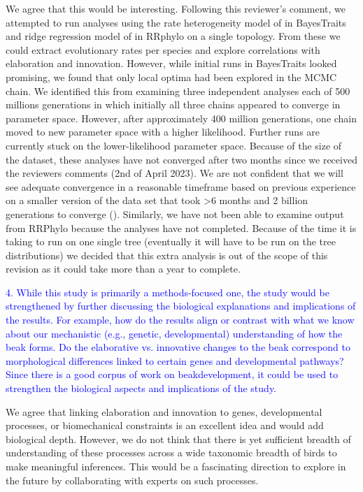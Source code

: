 \documentclass[12pt,letterpaper]{article}
\begin{document}
{We agree that this would be interesting. Following this reviewer’s comment, we attempted to run analyses using the rate heterogeneity model of \cite{venditti2011multiple} in BayesTraits and ridge regression model of \cite{castiglione2018} in  RRphylo on a single topology. From these we could extract evolutionary rates per species and explore correlations with elaboration and innovation. However, while initial runs in BayesTraits looked promising, we found that only local optima had been explored in the MCMC chain. We identified this from examining three independent analyses each of 500 millions generations in which initially all three chains appeared to converge in parameter space. However, after approximately 400 million generations, one chain moved to new parameter space with a higher likelihood. Further runs are currently stuck on the lower-likelihood parameter space. Because of the size of the dataset, these analyses have not converged after two months since we received the reviewers comments (2nd of April 2023). We are not confident that we will see adequate convergence in a reasonable timeframe based on previous experience on a smaller version of the data set that took >6 months and 2 billion generations to converge (\cite{chira2018correlates}). Similarly, we have not been able to examine output from RRPhylo because the analyses have not completed. Because of the time it is taking to run on one single tree (eventually it will have to be run on the tree distributions) we decided that this extra analysis is out of the scope of this revision as it could take more than a year to complete.

\textcolor{blue}{4. While this study is primarily a methods-focused one, the study would be strengthened by further discussing the biological explanations and implications of the results. For example, how do the results align or contrast with what we know about our mechanistic (e.g., genetic, developmental) understanding of how the beak forms. Do the elaborative vs. innovative changes to the beak correspond to morphological differences linked to certain genes and developmental pathways? Since there is a good corpus of work on beakdevelopment, it could be used to strengthen the biological aspects and implications of the study.}

We agree that linking elaboration and innovation to genes, developmental processes, or biomechanical constraints is an excellent idea and would add biological depth. However, we do not think that there is yet sufficient breadth of understanding of these processes across a wide taxonomic breadth of birds to make meaningful inferences. This would be a fascinating direction to explore in the future by collaborating with experts on such processes.

}
\end{document}
